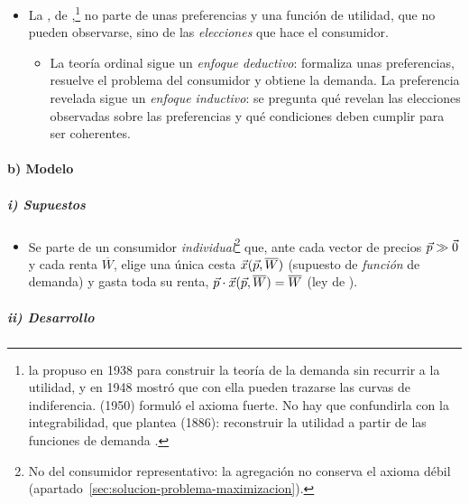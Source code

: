 \documentclass[11pt]{article}
\begin{document}
\begin{itemize}
\item La , de \textcite{Samuelson1938Note,Samuelson1948Consumption},\footnote{ la propuso en 1938 para construir la teoría de la demanda sin recurrir a la utilidad, y en 1948 mostró que con ella pueden trazarse las curvas de indiferencia.  (1950) formuló el axioma fuerte. No hay que confundirla con la integrabilidad, que plantea  (1886): reconstruir la utilidad a partir de las funciones de demanda .} no parte de unas preferencias y una función de utilidad, que no pueden observarse, sino de las \emph{elecciones} que hace el consumidor.
  \begin{itemize}
  \item La teoría ordinal sigue un \emph{enfoque deductivo}: formaliza unas preferencias, resuelve el problema del consumidor y obtiene la demanda. La preferencia revelada sigue un \emph{enfoque inductivo}: se pregunta qué revelan las elecciones observadas sobre las preferencias y qué condiciones deben cumplir para ser coherentes.
  \end{itemize}
\end{itemize}

\paragraph{b) Modelo}

\subparagraph{i) Supuestos}

\begin{itemize}
\item Se parte de un consumidor \emph{individual}\footnote{No del consumidor representativo: la agregación no conserva el axioma débil (apartado~\ref{sec:solucion-problema-maximizacion}).} que, ante cada vector de precios $\vec{p}\gg\vec{0}$ y cada renta $\overline{W}$, elige una única cesta $\vec{x}(\vec{p},\overline{W})$ (supuesto de \emph{función} de demanda) y gasta toda su renta, $\vec{p}\cdot \vec{x}(\vec{p},\overline{W})=\overline{W}$ (ley de ).
\end{itemize}

\subparagraph{ii) Desarrollo}
\end{document}
